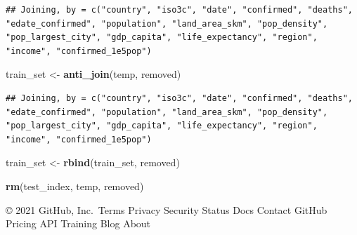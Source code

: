 \documentclass[]{article}
\newenvironment{Shaded}{\begin{snugshade}}{\end{snugshade}}
\newcommand{\KeywordTok}[1]{\textcolor[rgb]{0.13,0.29,0.53}{\textbf{#1}}}
\newcommand{\NormalTok}[1]{#1}
\newcommand{\StringTok}[1]{\textcolor[rgb]{0.31,0.60,0.02}{#1}}
\begin{document}
\begin{verbatim}
## Joining, by = c("country", "iso3c", "date", "confirmed", "deaths", "edate_confirmed", "population", "land_area_skm", "pop_density", "pop_largest_city", "gdp_capita", "life_expectancy", "region", "income", "confirmed_1e5pop")
\end{verbatim}

\begin{Shaded}
\begin{Highlighting}[]
\NormalTok{train_set <-}\StringTok{ }\KeywordTok{anti_join}\NormalTok{(temp, removed)}
\end{Highlighting}
\end{Shaded}

\begin{verbatim}
## Joining, by = c("country", "iso3c", "date", "confirmed", "deaths", "edate_confirmed", "population", "land_area_skm", "pop_density", "pop_largest_city", "gdp_capita", "life_expectancy", "region", "income", "confirmed_1e5pop")
\end{verbatim}

\begin{Shaded}
\begin{Highlighting}[]
\NormalTok{train_set <-}\StringTok{ }\KeywordTok{rbind}\NormalTok{(train_set, removed)}
\end{Highlighting}
\end{Shaded}

\begin{Shaded}
\begin{Highlighting}[]
\KeywordTok{rm}\NormalTok{(test_index, temp, removed)}
\end{Highlighting}
\end{Shaded}

© 2021 GitHub, Inc.~Terms Privacy Security Status Docs Contact GitHub
Pricing API Training Blog About
\end{document}
